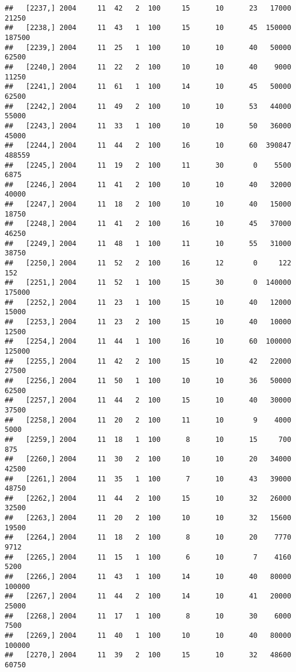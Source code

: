 \documentclass{article}\usepackage[]{graphicx}\usepackage[]{color}
\makeatletter
\newenvironment{kframe}{%
 \def\at@end@of@kframe{}%
 \ifinner\ifhmode%
  \def\at@end@of@kframe{\end{minipage}}%
  \begin{minipage}{\columnwidth}%
 \fi\fi%
 \def\FrameCommand##1{\hskip\@totalleftmargin \hskip-\fboxsep
 \colorbox{shadecolor}{##1}\hskip-\fboxsep
     \hskip-\linewidth \hskip-\@totalleftmargin \hskip\columnwidth}%
 \MakeFramed {\advance\hsize-\width
   \@totalleftmargin\z@ \linewidth\hsize
   \@setminipage}}%
 {\par\unskip\endMakeFramed%
 \at@end@of@kframe}
\newenvironment{knitrout}{}{} %
\makeatother
\begin{document}
\begin{knitrout}
\begin{kframe}
\begin{verbatim}
##   [2237,] 2004     11  42   2  100     15      10      23   17000   21250
##   [2238,] 2004     11  43   1  100     15      10      45  150000  187500
##   [2239,] 2004     11  25   1  100     10      10      40   50000   62500
##   [2240,] 2004     11  22   2  100     10      10      40    9000   11250
##   [2241,] 2004     11  61   1  100     14      10      45   50000   62500
##   [2242,] 2004     11  49   2  100     10      10      53   44000   55000
##   [2243,] 2004     11  33   1  100     10      10      50   36000   45000
##   [2244,] 2004     11  44   2  100     16      10      60  390847  488559
##   [2245,] 2004     11  19   2  100     11      30       0    5500    6875
##   [2246,] 2004     11  41   2  100     10      10      40   32000   40000
##   [2247,] 2004     11  18   2  100     10      10      40   15000   18750
##   [2248,] 2004     11  41   2  100     16      10      45   37000   46250
##   [2249,] 2004     11  48   1  100     11      10      55   31000   38750
##   [2250,] 2004     11  52   2  100     16      12       0     122     152
##   [2251,] 2004     11  52   1  100     15      30       0  140000  175000
##   [2252,] 2004     11  23   1  100     15      10      40   12000   15000
##   [2253,] 2004     11  23   2  100     15      10      40   10000   12500
##   [2254,] 2004     11  44   1  100     16      10      60  100000  125000
##   [2255,] 2004     11  42   2  100     15      10      42   22000   27500
##   [2256,] 2004     11  50   1  100     10      10      36   50000   62500
##   [2257,] 2004     11  44   2  100     15      10      40   30000   37500
##   [2258,] 2004     11  20   2  100     11      10       9    4000    5000
##   [2259,] 2004     11  18   1  100      8      10      15     700     875
##   [2260,] 2004     11  30   2  100     10      10      20   34000   42500
##   [2261,] 2004     11  35   1  100      7      10      43   39000   48750
##   [2262,] 2004     11  44   2  100     15      10      32   26000   32500
##   [2263,] 2004     11  20   2  100     10      10      32   15600   19500
##   [2264,] 2004     11  18   2  100      8      10      20    7770    9712
##   [2265,] 2004     11  15   1  100      6      10       7    4160    5200
##   [2266,] 2004     11  43   1  100     14      10      40   80000  100000
##   [2267,] 2004     11  44   2  100     14      10      41   20000   25000
##   [2268,] 2004     11  17   1  100      8      10      30    6000    7500
##   [2269,] 2004     11  40   1  100     10      10      40   80000  100000
##   [2270,] 2004     11  39   2  100     15      10      32   48600   60750

\end{verbatim}
\end{kframe}
\end{knitrout}
\end{document}
